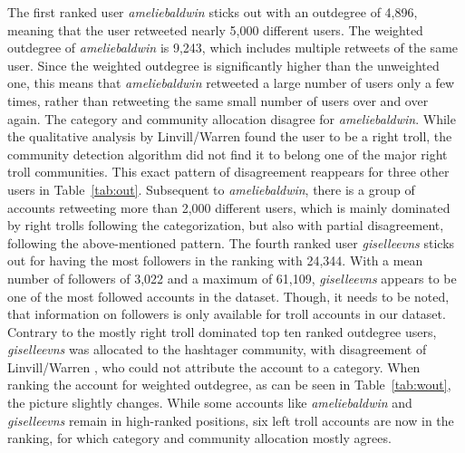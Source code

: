\documentclass[12pt, titlepage=true, toc=bib]{scrartcl}
\begin{document}
The first ranked user \textit{ameliebaldwin} sticks out with an outdegree of 4,896, meaning that the user retweeted nearly 5,000 different users. The weighted outdegree of \textit{ameliebaldwin} is 9,243, which includes multiple retweets of the same user. Since the weighted outdegree is significantly higher than the unweighted one, this means that \textit{ameliebaldwin} retweeted a large number of users only a few times, rather than retweeting the same small number of users over and over again. The category and community allocation disagree for \textit{ameliebaldwin}. While the qualitative analysis by Linvill/Warren \cite*{linvill_troll_2018} found the user to be a right troll, the community detection algorithm did not find it to belong one of the major right troll communities. This exact pattern of disagreement reappears for three other users in Table~\ref{tab:out}. Subsequent to \textit{ameliebaldwin}, there is a group of accounts retweeting more than 2,000 different users, which is mainly dominated by right trolls following the categorization, but also with partial disagreement, following the above-mentioned pattern. The fourth ranked user \textit{giselleevns} sticks out for having the most followers in the ranking with 24,344. With a mean number of followers of 3,022 and a maximum of 61,109, \textit{giselleevns} appears to be one of the most followed accounts in the dataset. Though, it needs to be noted, that information on followers is only available for troll accounts in our dataset. Contrary to the mostly right troll dominated top ten ranked outdegree users, \textit{giselleevns} was allocated to the hashtager community, with disagreement of Linvill/Warren \cite*{linvill_troll_2018}, who could not attribute the account to a category. When ranking the account for weighted outdegree, as can be seen in Table~\ref{tab:wout}, the picture slightly changes. While some accounts like \textit{ameliebaldwin} and \textit{giselleevns} remain in high-ranked positions, six left troll accounts are now in the ranking, for which category and community allocation mostly agrees.
\end{document}
